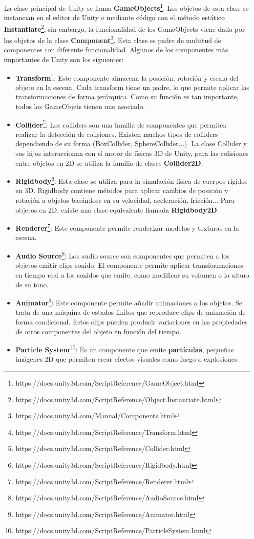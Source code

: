 La clase principal de Unity se llama \textbf{GameObjects}\footnote{https://docs.unity3d.com/ScriptReference/GameObject.html}. Los objetos de esta clase se instancian en el editor de Unity o mediante código con el método estático \textbf{Instantiate}\footnote{https://docs.unity3d.com/ScriptReference/Object.Instantiate.html}, sin embargo, la funcionalidad de los GameObjects viene dada por los objetos de la clase \textbf{Component}\footnote{https://docs.unity3d.com/Manual/Components.html}. Esta clase es padre de multitud de componentes con diferente funcionalidad. Algunos de los componentes más importantes de Unity son los siguientes:
\begin{itemize}
\item \textbf{Transform}\footnote{https://docs.unity3d.com/ScriptReference/Transform.html}: Este componente almacena la posición, rotación y escala del objeto en la escena. Cada transform tiene un padre, lo que permite aplicar las transformaciones de forma jerárquica. Como su función es tan importante, todos los GameObjets tienen uno asociado.
\item \textbf{Collider}\footnote{https://docs.unity3d.com/ScriptReference/Collider.html}: Los colliders son una familia de componentes que permiten realizar la detección de colisiones. Existen muchos tipos de colliders dependiendo de su forma (BoxCollider, SphereCollider...). La clase Collider y sus hijos interaccionan con el motor de físicas 3D de Unity, para las colisiones entre objetos en 2D se utiliza la familia de clases \textbf{Collider2D}.
\item \textbf{Rigidbody}\footnote{https://docs.unity3d.com/ScriptReference/Rigidbody.html}: Esta clase se utiliza para la simulación física de cuerpos rígidos en 3D. Rigidbody contiene métodos para aplicar cambios de posición y rotación a objetos basándose en su velocidad, aceleración, fricción... Para objetos en 2D, existe una clase equivalente llamada \textbf{Rigidbody2D}.
\item \textbf{Renderer}\footnote{https://docs.unity3d.com/ScriptReference/Renderer.html}: Este componente permite renderizar modelos y texturas en la escena. 
\item \textbf{Audio Source}\footnote{https://docs.unity3d.com/ScriptReference/AudioSource.html}: Los audio source son componentes que permiten a los objetos emitir clips sonido. El componente permite aplicar transformaciones en tiempo real a los sonidos que emite, como modificar su volumen o la altura de su tono.
\item \textbf{Animator}\footnote{https://docs.unity3d.com/ScriptReference/Animator.html}: Este componente permite añadir animaciones a los objetos. Se trata de una máquina de estados finitos que reproduce clips de animación de forma condicional. Estos clips pueden producir variaciones en las propiedades de otros componentes del objeto en función del tiempo.
\item \textbf{Particle System}\footnote{https://docs.unity3d.com/ScriptReference/ParticleSystem.html}: Es un componente que emite \textbf{partículas}, pequeñas imágenes 2D que permiten crear efectos visuales como fuego o explosiones.
\end{itemize}

